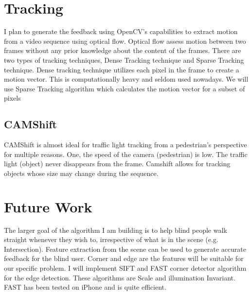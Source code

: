 \section{Tracking}
I plan to generate the feedback using OpenCV’s capabilities to extract motion from a video sequence using optical flow. Optical flow assess motion between two frames without any prior knowledge about the content of the frames. There are two types of tracking techniques, Dense Tracking technique and Sparse Tracking technique. Dense tracking technique utilizes each pixel in the frame to create a motion vector. This is computationally heavy and seldom used nowadays. We will use Sparse Tracking algorithm which calculates the motion vector for a subset of pixels
\subsection{CAMShift}
CAMShift is almost ideal for traffic light tracking from a pedestrian’s perspective for multiple reasons. One, the speed of the camera (pedestrian) is low. The traffic light (object) never disappears from the frame. Camshift allows for tracking objects whose size may change during the sequence. 

\section{Future Work}
The larger goal of the algorithm I am building is to help blind people walk straight whenever they wish to, irrespective of what is in the scene (e.g. Intersection). Feature extraction from the scene can be used to generate accurate feedback for the blind user. Corner and edge are the features will be suitable for our specific problem. I will implement SIFT and FAST corner detector algorithm for the edge detection. These algorithms are Scale and illumination Invariant. FAST has been tested on iPhone and is quite efficient.  




